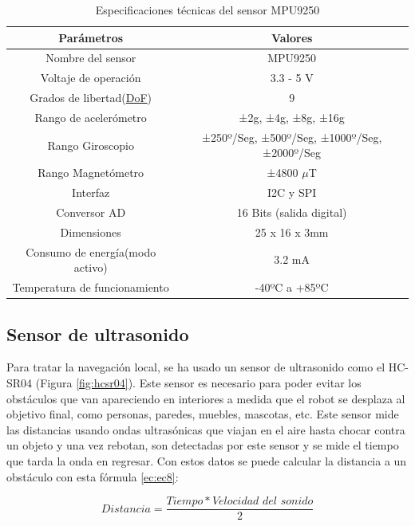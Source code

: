 \begin{table}[H]
\begin{center}
\begin{tabular}{|c|c|}
\hline
\textbf{Parámetros} & \textbf{Valores} \\
\hline

Nombre del sensor & MPU9250 \\
Voltaje de operación & 3.3 - 5 V \\  
Grados de libertad(\hyperlink{DoF}{DoF}) & 9 \\   
Rango de acelerómetro & ±2g, ±4g, ±8g, ±16g \\   
Rango Giroscopio & ±250º/Seg, ±500º/Seg, ±1000º/Seg, ±2000º/Seg \\
Rango Magnetómetro & ±4800 $ \mu $T \\  
Interfaz & I2C y SPI \\   
Conversor AD & 16 Bits (salida digital) \\   
Dimensiones & 25 x 16 x 3mm \\
Consumo de energía(modo activo) & 3.2 mA \\
Temperatura de funcionamiento & -40ºC a +85ºC \\ 


\hline
\end{tabular}
\caption{Especificaciones técnicas del sensor MPU9250}
\label{cuadro:ejemplo}
\end{center}
\end{table}

\subsection{Sensor de ultrasonido}
\label{subsec:hscr04}


Para tratar la navegación local, se ha usado un sensor de ultrasonido como el HC-SR04 (Figura \ref{fig:hcsr04}). Este sensor es necesario para poder evitar los obstáculos que van apareciendo en interiores a medida que el robot se desplaza al objetivo final, como personas, paredes, muebles, mascotas, etc. Este sensor mide las distancias usando ondas ultrasónicas que viajan en el aire hasta chocar contra un objeto y una vez rebotan, son detectadas por este sensor y se mide el tiempo que tarda la onda en regresar. Con estos datos se puede calcular la distancia a un obstáculo con esta fórmula \ref{ec:ec8}:

\begin{myequation}[h]
\begin{equation}
Distancia = \frac{Tiempo * \textit{Velocidad del sonido}}{2}
\nonumber
\label{ec:ec8}
\end{equation}
\caption[Ecuación de distancia basada en ultrasonidos]{Ecuación de distancia basada en ultrasonidos}
\end{myequation} 

